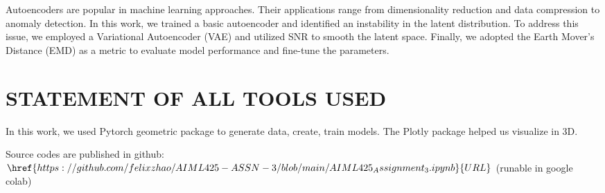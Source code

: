 \documentclass{article}
\begin{document}
Autoencoders are popular in machine learning approaches. Their applications range from dimensionality reduction and data compression to anomaly detection. In this work, we trained a basic autoencoder and identified an instability in the latent distribution. To address this issue, we employed a Variational Autoencoder (VAE) and utilized SNR to smooth the latent space. Finally, we adopted the Earth Mover's Distance (EMD) as a metric to evaluate model performance and fine-tune the parameters.


\section{STATEMENT OF ALL TOOLS USED}
\label{sec:statementofalltoolsused}

In this work, we used Pytorch geometric package to generate data, create, train models. 
The Plotly package helped us visualize in 3D. 

Source codes are published in github: 
$\href{https://github.com/felixzhao/AIML425-ASSN-3/blob/main/AIML425_Assignment_3.ipynb}{URL}$
 (runable in google colab)




\vfill\pagebreak



\end{document}
